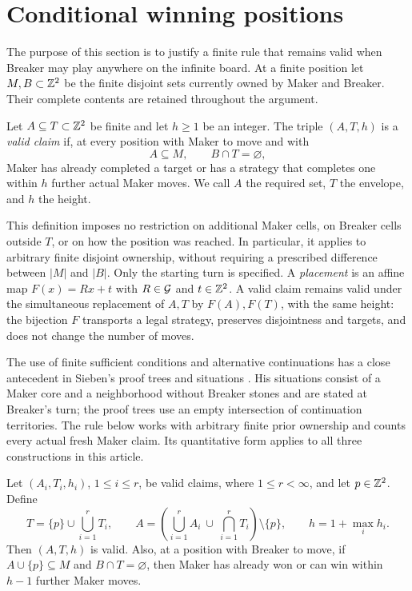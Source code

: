 \section{Conditional winning positions}\label{sec:templates}\label{sec:calculus}

The purpose of this section is to justify a finite rule that remains
valid when Breaker may play anywhere on the infinite board.
At a finite position let $M,B\subset\mathbb Z^2$ be the finite disjoint
sets currently owned by Maker and Breaker. Their complete contents
are retained throughout the argument.

\begin{definition}\label{def:claim}
Let $A\subseteq T\subset\mathbb Z^2$ be finite and let $h\ge1$ be an integer.
The triple $(A,T,h)$ is a \emph{valid claim} if, at every position with
Maker to move and with
\[
 A\subseteq M,\qquad B\cap T=\varnothing,
\]
Maker has already completed a target or has a strategy that completes
one within $h$ further actual Maker moves. We call $A$ the required
set, $T$ the envelope, and $h$ the height.
\end{definition}

This definition imposes no restriction on additional Maker cells,
on Breaker cells outside $T$, or on how the position was reached.
In particular, it applies to arbitrary finite disjoint ownership,
without requiring a prescribed difference between $|M|$ and $|B|$.
Only the starting turn is specified.
A \emph{placement} is an affine map $F(x)=Rx+t$ with $R\in\mathcal G$ and
$t\in\mathbb Z^2$. A valid claim remains valid under the simultaneous
replacement of $A,T$ by $F(A),F(T)$, with the same height: the
bijection $F$ transports a legal strategy, preserves disjointness
and targets, and does not change the number of moves.

The use of finite sufficient conditions and alternative continuations
has a close antecedent in Sieben's proof trees and situations
\cite[Sections~2--3]{Sieben2008}. His situations consist of a Maker
core and a neighborhood without Breaker stones and are stated at
Breaker's turn; the proof trees use an empty intersection of
continuation territories. The rule below works with arbitrary finite
prior ownership and counts every actual fresh Maker claim. Its
quantitative form applies to all three constructions in this article.

\begin{lemma}\label{lem:combination}\label{thm:composition}
Let $(A_i,T_i,h_i)$, $1\le i\le r$, be valid claims, where
$1\le r<\infty$, and let $p\in\mathbb Z^2$. Define
\begin{equation}\label{eq:combination}
 T=\{p\}\cup\bigcup_{i=1}^rT_i,
 \qquad
 A=\left(\bigcup_{i=1}^r A_i\ \cup\
             \bigcap_{i=1}^rT_i\right)\setminus\{p\},
 \qquad h=1+\max_i h_i.
\end{equation}
Then $(A,T,h)$ is valid. Also, at a position with Breaker to move,
if $A\cup\{p\}\subseteq M$ and $B\cap T=\varnothing$, then Maker
has already won or can win within $h-1$ further Maker moves.
\end{lemma}

